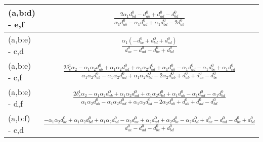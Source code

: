 \documentclass[12pt]{article}
\begin{document}
\begin{longtable}{l|c}
(a,b:d) - e,f& {$\displaystyle \frac{2 \alpha_{1} d^{\scriptscriptstyle 0}_{bd} - d^{\scriptscriptstyle 0}_{ab} + d^{\scriptscriptstyle 0}_{ad} - d^{\scriptscriptstyle 0}_{bd}}{\alpha_{1} d^{\scriptscriptstyle 0}_{ab} - \alpha_{1} d^{\scriptscriptstyle 0}_{ad} + \alpha_{1} d^{\scriptscriptstyle 0}_{bd} - 2 d^{\scriptscriptstyle 0}_{ab}} $}\\[0.4cm]\hline 
(a,b:e) - c,d& {$\displaystyle \frac{\alpha_{1} \left(- d^{\scriptscriptstyle 0}_{bc} + d^{\scriptscriptstyle 0}_{bd} + d^{\scriptscriptstyle 0}_{cd}\right)}{d^{\scriptscriptstyle 0}_{ac} - d^{\scriptscriptstyle 0}_{ad} - d^{\scriptscriptstyle 0}_{bc} + d^{\scriptscriptstyle 0}_{bd}} $}\\[0.4cm]\hline 
(a,b:e) - c,f& {$\displaystyle \frac{2 \delta^1_{e} \alpha_{2} - \alpha_{1} \alpha_{2} d^{\scriptscriptstyle 0}_{ab} + \alpha_{1} \alpha_{2} d^{\scriptscriptstyle 0}_{ad} + \alpha_{1} \alpha_{2} d^{\scriptscriptstyle 0}_{bd} + \alpha_{1} d^{\scriptscriptstyle 0}_{ab} - \alpha_{1} d^{\scriptscriptstyle 0}_{ad} - \alpha_{1} d^{\scriptscriptstyle 0}_{bc} + \alpha_{1} d^{\scriptscriptstyle 0}_{cd}}{\alpha_{1} \alpha_{2} d^{\scriptscriptstyle 0}_{ab} - \alpha_{1} \alpha_{2} d^{\scriptscriptstyle 0}_{ad} + \alpha_{1} \alpha_{2} d^{\scriptscriptstyle 0}_{bd} - 2 \alpha_{2} d^{\scriptscriptstyle 0}_{ab} + d^{\scriptscriptstyle 0}_{ab} + d^{\scriptscriptstyle 0}_{ac} - d^{\scriptscriptstyle 0}_{bc}} $}\\[0.4cm]\hline 
(a,b:e) - d,f& {$\displaystyle \frac{2 \delta^1_{e} \alpha_{2} - \alpha_{1} \alpha_{2} d^{\scriptscriptstyle 0}_{ab} + \alpha_{1} \alpha_{2} d^{\scriptscriptstyle 0}_{ad} + \alpha_{1} \alpha_{2} d^{\scriptscriptstyle 0}_{bd} + \alpha_{1} d^{\scriptscriptstyle 0}_{ab} - \alpha_{1} d^{\scriptscriptstyle 0}_{ad} - \alpha_{1} d^{\scriptscriptstyle 0}_{bd}}{\alpha_{1} \alpha_{2} d^{\scriptscriptstyle 0}_{ab} - \alpha_{1} \alpha_{2} d^{\scriptscriptstyle 0}_{ad} + \alpha_{1} \alpha_{2} d^{\scriptscriptstyle 0}_{bd} - 2 \alpha_{2} d^{\scriptscriptstyle 0}_{ab} + d^{\scriptscriptstyle 0}_{ab} + d^{\scriptscriptstyle 0}_{ad} - d^{\scriptscriptstyle 0}_{bd}} $}\\[0.4cm]\hline 
(a,b:f) - c,d& {$\displaystyle \frac{- \alpha_{1} \alpha_{2} d^{\scriptscriptstyle 0}_{bc} + \alpha_{1} \alpha_{2} d^{\scriptscriptstyle 0}_{bd} + \alpha_{1} \alpha_{2} d^{\scriptscriptstyle 0}_{cd} - \alpha_{2} d^{\scriptscriptstyle 0}_{ac} + \alpha_{2} d^{\scriptscriptstyle 0}_{ad} + \alpha_{2} d^{\scriptscriptstyle 0}_{bc} - \alpha_{2} d^{\scriptscriptstyle 0}_{bd} + d^{\scriptscriptstyle 0}_{ac} - d^{\scriptscriptstyle 0}_{ad} - d^{\scriptscriptstyle 0}_{bc} + d^{\scriptscriptstyle 0}_{bd}}{d^{\scriptscriptstyle 0}_{ac} - d^{\scriptscriptstyle 0}_{ad} - d^{\scriptscriptstyle 0}_{bc} + d^{\scriptscriptstyle 0}_{bd}} $}\\[0.4cm]\hline 

\end{longtable}
\end{document}
